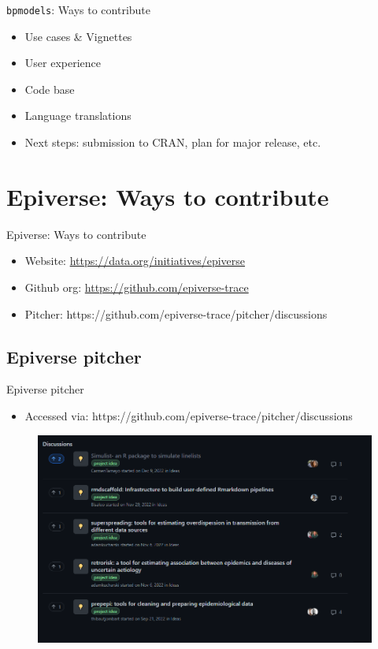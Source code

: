 \documentclass[10pt]{beamer}
\begin{document}
\begin{frame}[fragile]{\texttt{bpmodels}: Ways to contribute}
\begin{itemize}
\item Use cases \& Vignettes
\item User experience
\item Code base
\item Language translations
\item Next steps: submission to CRAN, plan for major release, etc.
\end{itemize}
\end{frame}

\section{Epiverse: Ways to contribute}
\begin{frame}[fragile]{Epiverse: Ways to contribute}
	\begin{itemize}
\item Website: \url{https://data.org/initiatives/epiverse}
\item Github org: \url{https://github.com/epiverse-trace}
\item Pitcher: {https://github.com/epiverse-trace/pitcher/discussions}
	\end{itemize}
\end{frame}

\subsection{Epiverse pitcher}
\begin{frame}[fragile]{Epiverse pitcher}
	\begin{itemize}
\item Accessed via: {https://github.com/epiverse-trace/pitcher/discussions}
\end{itemize}	
\begin{figure}
	\centering
	\includegraphics[scale=0.45]{../figures/pitcher.png}
\end{figure}
\end{frame}
\end{document}
